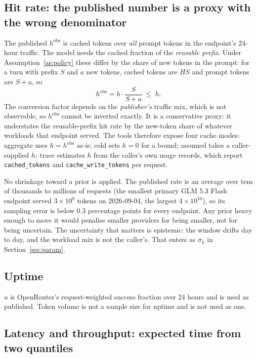 \documentclass[11pt]{article}
\begin{document}
\subsection{Hit rate: the published number is a proxy with the wrong denominator}

The published $h^{\text{obs}}$ is cached tokens over \emph{all} prompt tokens
in the endpoint's 24-hour traffic. The model needs the cached fraction of the
\emph{reusable prefix}. Under Assumption~\ref{as:policy} these differ by the
share of new tokens in the prompt: for a turn with prefix $S$ and $a$ new
tokens, cached tokens are $H S$ and prompt tokens are $S + a$, so
\[
  h^{\text{obs}} = h \cdot \frac{S}{S + a} \;\le\; h .
\]
The conversion factor depends on the \emph{publisher's} traffic mix, which is
not observable, so $h^{\text{obs}}$ cannot be inverted exactly. It is a
conservative proxy: it understates the reusable-prefix hit rate by the new-token
share of whatever workloads that endpoint served. The tools therefore expose
four cache modes: \textsf{aggregate} uses $h = h^{\text{obs}}$ as-is;
\textsf{cold} sets $h = 0$ for a bound; \textsf{assumed} takes a caller-supplied
$h$; \textsf{trace} estimates $h$ from the caller's own usage records, which
report \texttt{cached\_tokens} and \texttt{cache\_write\_tokens} per request.

No shrinkage toward a prior is applied. The published rate is an average over
tens of thousands to millions of requests (the smallest primary GLM 5.3 Flash
endpoint served $3 \times 10^8$ tokens on 2026-09-04, the largest
$4 \times 10^{10}$), so its sampling error is below $0.3$ percentage points for
every endpoint. Any prior heavy enough to move it would penalise smaller
providers for being smaller, not for being uncertain. The uncertainty that
matters is epistemic: the window drifts day to day, and the workload mix is not
the caller's. That enters as $\sigma_h$ in Section~\ref{sec:param}.

\subsection{Uptime}

$u$ is OpenRouter's request-weighted success fraction over 24 hours and is used
as published. Token volume is not a sample size for uptime and is not used as
one.

\subsection{Latency and throughput: expected time from two quantiles}
\end{document}
